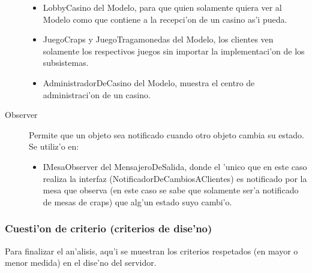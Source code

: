 \begin{description}
	\begin{itemize}
	\item LobbyCasino del Modelo, para que quien solamente quiera ver al Modelo como que contiene a la recepci'on de un casino as'i pueda.
	\item JuegoCraps y JuegoTragamonedas del Modelo, los clientes ven solamente los respectivos juegos sin importar la implementaci'on de los subsistemas.
	\item AdministradorDeCasino del Modelo, muestra el centro de administraci'on de un casino.
	\end{itemize}
\item[Observer] Permite que un objeto sea notificado cuando otro objeto cambia su estado. Se utiliz'o en:
	\begin{itemize}
	\item IMesaObserver del MensajeroDeSalida, donde el 'unico que en este caso realiza la interfaz (NotificadorDeCambiosAClientes) es notificado por la mesa que observa (en este caso se sabe que solamente ser'a notificado de mesas de craps) que alg'un estado suyo cambi'o.
	\end{itemize}
\end{description}



\subsubsection{Cuesti'on de criterio (criterios de dise'no)}
Para finalizar el an'alisis, aqu'i se muestran los criterios respetados (en mayor o menor medida) en el dise'no del servidor.


